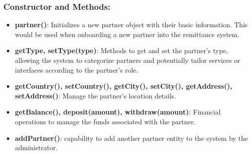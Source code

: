 \documentclass[onecolumn, letterpaper, ]{report}
\begin{document}
            \subsubsection{Constructor and Methods:}
            \begin{itemize}
                \item \textbf{partner()}: Initializes a new partner object with their basic information. This would be used when onboarding a new partner into the remittance system.
                \item \textbf{getType, setType(type)}: Methods to get and set the partner's type, allowing the system to categorize partners and potentially tailor services or interfaces according to the partner's role.
                \item \textbf{getCountry(), setCountry(), getCity(), setCity(), getAddress(), setAddress()}:  Manage the partner's location details. 
                \item \textbf{getBalance(), deposit(amount), withdraw(amount)}: Financial operations to manage the funds associated with the partner.
                \item \textbf{addPartner()}: capability to add another partner entity to the system by the administrator.

            \end{itemize}
\end{document}
